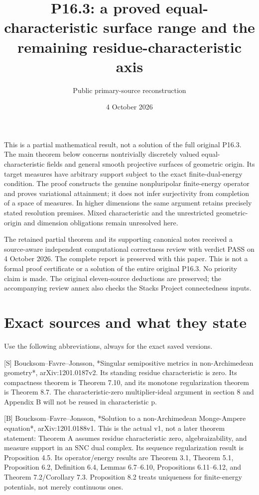 \documentclass[11pt]{article}
\title{P16.3: a proved equal-characteristic surface range and the remaining residue-characteristic axis}
\author{Public primary-source reconstruction}
\date{4 October 2026}
\begin{document}
\maketitle
This is a partial mathematical result, not a solution of the full original P16.3. The main theorem below concerns nontrivially discretely valued equal-characteristic fields and general smooth projective surfaces of geometric origin. Its target measures have arbitrary support subject to the exact finite-dual-energy condition. The proof constructs the genuine nonpluripolar finite-energy operator and proves variational attainment; it does not infer surjectivity from completion of a space of measures. In higher dimensions the same argument retains precisely stated resolution premises. Mixed characteristic and the unrestricted geometric-origin and dimension obligations remain unresolved here.

The retained partial theorem and its supporting canonical notes received a source-aware independent computational correctness review with verdict PASS on 4 October 2026. The complete report is preserved with this paper. This is not a formal proof certificate or a solution of the entire original P16.3. No priority claim is made. The original eleven-source deductions are preserved; the accompanying review annex also checks the Stacks Project connectedness inputs.

\section{Exact sources and what they state}

Use the following abbreviations, always for the exact saved versions.

[S] Boucksom--Favre--Jonsson, *Singular semipositive metrics in non-Archimedean geometry*, arXiv:1201.0187v2. Its standing residue characteristic is zero. Its compactness theorem is Theorem 7.10, and its monotone regularization theorem is Theorem 8.7. The characteristic-zero multiplier-ideal argument in section 8 and Appendix B will not be reused in characteristic p.

[B] Boucksom--Favre--Jonsson, *Solution to a non-Archimedean Monge-Ampere equation*, arXiv:1201.0188v1. This is the actual v1, not a later theorem statement: Theorem A assumes residue characteristic zero, algebraizability, and measure support in an SNC dual complex. Its sequence regularization result is Proposition 4.5. Its operator/energy results are Theorem 3.1, Theorem 5.1, Proposition 6.2, Definition 6.4, Lemmas 6.7--6.10, Propositions 6.11--6.12, and Theorem 7.2/Corollary 7.3. Proposition 8.2 treats uniqueness for finite-energy potentials, not merely continuous ones.
\end{document}
